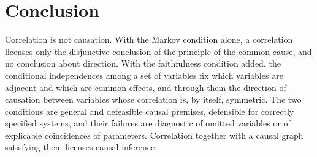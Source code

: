 \documentclass{situationist-preprint}
\begin{document}
\section{Conclusion}\label{s:conclusion}

Correlation is not causation. With the Markov condition alone, a correlation licenses only the disjunctive conclusion of the principle of the common cause, and no conclusion about direction. With the faithfulness condition added, the conditional independences among a set of variables fix which variables are adjacent and which are common effects, and through them the direction of causation between variables whose correlation is, by itself, symmetric. The two conditions are general and defeasible causal premises, defensible for correctly specified systems, and their failures are diagnostic of omitted variables or of explicable coincidences of parameters. Correlation together with a causal graph satisfying them licenses causal inference.
\end{document}
